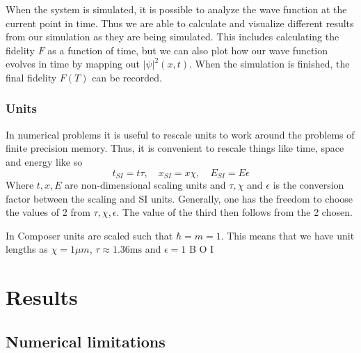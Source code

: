 \documentclass[aps,pra,reprint,superscriptaddress]{revtex4-1}
\begin{document}
When the system is simulated, it is possible to analyze the wave function at the current point in time. Thus we are able to calculate and visualize different results from our simulation as they are being simulated. This includes calculating the fidelity $F$ as a function of time, but we can also plot how our wave function evolves in time by mapping out $|\psi|^2(x,t)$. When the simulation is finished, the final fidelity $F(T)$ can be recorded.

\subsubsection{Units}

In numerical problems it is useful to rescale units to work around the problems of finite precision memory. Thus, it is convenient to rescale things like time, space and energy like so 
\begin{equation}
	t_{SI} = t \tau, \quad  x_{SI} = x\chi, \quad  E_{SI} = E\epsilon
\end{equation}
Where $t,x,E$ are non-dimensional scaling units and $\tau, \chi$ and $\epsilon$ is the conversion factor between the scaling and SI units. Generally, one has the freedom to choose the values of 2 from $\tau, \chi, \epsilon$. The value of the third then follows from the 2 chosen. 

In Composer units are scaled such that $\hbar = m = 1$. This means that we have unit lengths as $\chi = 1 \mu m$, $\tau \approx 1.36 \text{ms}$ and $\epsilon = 1 $ B O I


\section{\label{sec:results}Results}
\subsection{\label{subsec:numericalLimitations} Numerical limitations}
\end{document}
